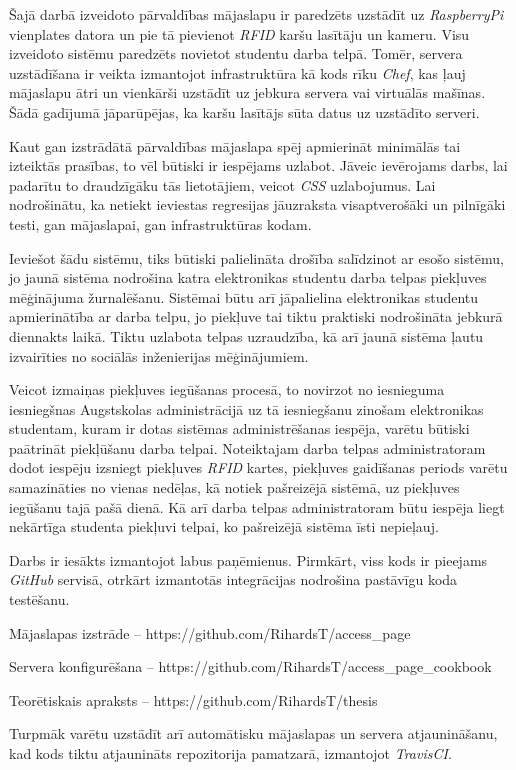 Šajā darbā izveidoto pārvaldības mājaslapu ir paredzēts uzstādīt uz
\textit{RaspberryPi} vienplates datora un pie tā pievienot \textit{RFID}
karšu lasītāju un kameru. Visu izveidoto sistēmu paredzēts novietot studentu darba telpā.
Tomēr, servera uzstādīšana ir veikta izmantojot infrastruktūra kā kods rīku \textit{Chef}, kas ļauj mājaslapu ātri un vienkārši uzstādīt uz jebkura servera vai virtuālās mašīnas. Šādā gadījumā jāparūpējas, ka karšu lasītājs sūta datus uz uzstādīto serveri.

Kaut gan izstrādātā pārvaldības mājaslapa spēj apmierināt minimālās tai izteiktās prasības, to vēl būtiski ir iespējams uzlabot. Jāveic ievērojams darbs, lai padarītu to draudzīgāku tās lietotājiem, veicot \textit{CSS} uzlabojumus. Lai nodrošinātu, ka netiekt ieviestas regresijas jāuzraksta visaptverošāki un pilnīgāki testi, gan mājaslapai, gan infrastruktūras kodam.

Ieviešot šādu sistēmu, tiks būtiski palielināta drošība salīdzinot ar esošo sistēmu, jo jaunā sistēma nodrošina katra elektronikas studentu darba telpas piekļuves mēģinājuma žurnalēšanu. Sistēmai būtu arī jāpalielina elektronikas studentu apmierinātība ar darba telpu, jo piekļuve tai tiktu praktiski nodrošināta jebkurā diennakts laikā. Tiktu uzlabota telpas uzraudzība, kā arī jaunā sistēma ļautu izvairīties no sociālās inženierijas mēģinājumiem.

Veicot izmaiņas piekļuves iegūšanas procesā, to novirzot no iesnieguma iesniegšnas Augstskolas administrācijā uz tā iesniegšanu zinošam elektronikas studentam, kuram ir dotas sistēmas administrēšanas iespēja, varētu būtiski paātrināt piekļūšanu darba telpai. Noteiktajam darba telpas administratoram dodot iespēju izsniegt piekļuves \textit{RFID} kartes, piekļuves gaidīšanas periods varētu samazināties no vienas nedēļas, kā notiek pašreizējā sistēmā, uz piekļuves iegūšanu tajā pašā dienā. Kā arī darba telpas administratoram būtu iespēja liegt nekārtīga studenta piekļuvi telpai, ko pašreizējā sistēma īsti nepieļauj.

Darbs ir iesākts izmantojot labus paņēmienus. Pirmkārt, viss kods ir pieejams \textit{GitHub} servisā, otrkārt izmantotās integrācijas nodrošina pastāvīgu koda testēšanu.
\begin{describe}
	\item Mājaslapas izstrāde -- https://github.com/RihardsT/access_page
	\item Servera konfigurēšana -- https://github.com/RihardsT/access_page_cookbook
	\item Teorētiskais apraksts -- https://github.com/RihardsT/thesis
\end{describe}

Turpmāk varētu uzstādīt arī automātisku mājaslapas un servera atjaunināšanu, kad kods tiktu atjaunināts repozitorija pamatzarā, izmantojot \textit{TravisCI}.